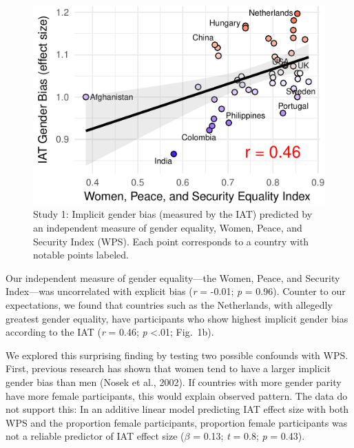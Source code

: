 \documentclass[10pt, letterpaper]{article}
\newenvironment{CodeChunk}{}{}
\begin{document}
\begin{CodeChunk}
\begin{figure}[t]

{\centering \includegraphics{figs/WPS_plot-1} 

}

\caption[Study 1]{Study 1: Implicit gender bias (measured by the IAT) predicted by an independent measure of gender equality, Women, Peace, and Security Index (WPS).  Each point corresponds to a country with notable points labeled.}\label{fig:WPS_plot}
\end{figure}
\end{CodeChunk}

Our independent measure of gender equality---the Women, Peace, and
Security Index---was uncorrelated with explicit bias (\emph{r} = -0.01;
\emph{p} = 0.96). Counter to our expectations, we found that countries
such as the Netherlands, with allegedly greatest gender equality, have
participants who show highest implicit gender bias according to the IAT
(\emph{r} = 0.46; \emph{p} \textless{}.01; Fig.~1b).

We explored this surprising finding by testing two possible confounds
with WPS. First, previous research has shown that women tend to have a
larger implicit gender bias than men (Nosek et al., 2002). If countries
with more gender parity have more female participants, this would
explain observed pattern. The data do not support this: In an additive
linear model predicting IAT effect size with both WPS and the proportion
female participants, proportion female participants was not a reliable
predictor of IAT effect size (\(\beta\) = 0.13; \emph{t} = 0.8; \emph{p}
= 0.43).
\end{document}
